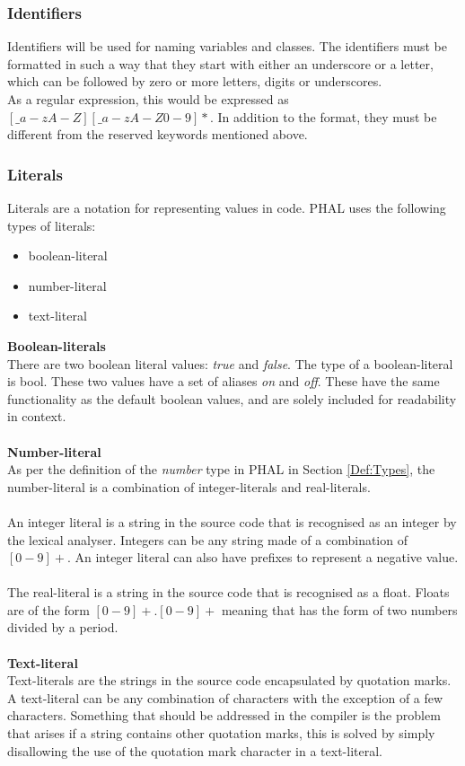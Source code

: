 \subsubsection{Identifiers}
Identifiers will be used for naming variables and classes. The identifiers must be formatted in such a way that they start with either an underscore or a letter, which can be followed by zero or more letters, digits or underscores.\\
As a regular expression, this would be expressed as $[\_a-zA-Z][\_a-zA-Z0-9]*$.
In addition to the format, they must be different from the reserved keywords mentioned above.


\subsubsection{Literals}
Literals are a notation for representing values in code. PHAL uses the following types of literals:
\begin{itemize}
    \item boolean-literal
    \item number-literal
    \item text-literal
\end{itemize}
\textbf{Boolean-literals}
\\
There are two boolean literal values: \textit{true} and \textit{false}. The type of a boolean-literal is bool.
These two values have a set of aliases \textit{on} and \textit{off}. These have the same functionality as the default boolean values, and are solely included for readability in context.
\\\\
\textbf{Number-literal}
\\
As per the definition of the \textit{number} type in PHAL in Section \ref{Def:Types}, the number-literal is a combination of integer-literals and real-literals.
\\\\
An integer literal is a string in the source code that is recognised as an integer by the lexical analyser. 
Integers can be any string made of a combination of $[0-9]+$. An integer literal can also have prefixes to represent a negative value.
\\\\
The real-literal is a string in the source code that is recognised as a float. Floats are of the form $[0-9]+.[0-9]+$ meaning that has the form of two numbers divided by a period. 
\\\\
\textbf{Text-literal}
\\
Text-literals are the strings in the source code encapsulated by quotation marks. A text-literal can be any combination of characters with the exception of a few characters. Something that should be addressed in the compiler is the problem that arises if a string contains other quotation marks, this is solved by simply disallowing the use of the quotation mark character in a text-literal. 


